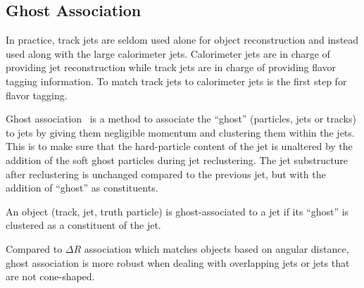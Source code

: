 \subsection{Ghost Association}
\label{sec:ga}

\par In practice, track jets are seldom used alone for object reconstruction and instead used along with the large calorimeter jets. Calorimeter jets are in charge of providing jet reconstruction while track jets are in charge of providing flavor tagging information. To match track jets to calorimeter jets is the first step for flavor tagging. 
\par Ghost association~\cite{Cacciari:2007fd,Cacciari:2008gn} is a method to associate the ``ghost'' (particles, jets or tracks) to jets by giving them negligible momentum and clustering them within the jets. This is to make sure that the hard-particle content of the jet is unaltered by the addition of the soft ghost particles during jet reclustering. The jet substructure after reclustering is unchanged compared to the previous jet, but with the addition of ``ghost'' as constituents.
\par An object (track, jet, truth particle) is ghost-associated to a jet if its ``ghost'' is clustered as a constituent of the jet.
\par Compared to $\Delta R$ association which matches objects based on angular distance, ghost association is more robust when dealing with overlapping jets or jets that are not cone-shaped.



